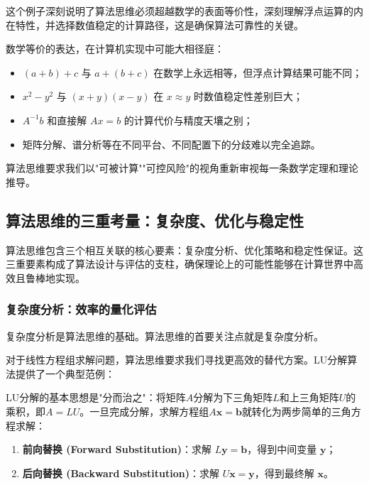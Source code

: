 这个例子深刻说明了算法思维必须超越数学的表面等价性，深刻理解浮点运算的内在特性，并选择数值稳定的计算路径，这是确保算法可靠性的关键。

\vspace{0.5em}
\begin{tcolorbox}[colback=red!5!white,colframe=red!75!black,title=警示：数学等价 ≠ 计算等价]
数学等价的表达，在计算机实现中可能大相径庭：
\begin{itemize}
\item $(a+b)+c$ 与 $a+(b+c)$ 在数学上永远相等，但浮点计算结果可能不同；
\item $x^2-y^2$ 与 $(x+y)(x-y)$ 在 $x\approx y$ 时数值稳定性差别巨大；
\item $A^{-1}b$ 和直接解 $Ax=b$ 的计算代价与精度天壤之别；
\item 矩阵分解、谱分析等在不同平台、不同配置下的分歧难以完全追踪。
\end{itemize}
算法思维要求我们以"可被计算""可控风险"的视角重新审视每一条数学定理和理论推导。
\end{tcolorbox}

\subsection{算法思维的三重考量：复杂度、优化与稳定性}
算法思维包含三个相互关联的核心要素：复杂度分析、优化策略和稳定性保证。这三重要素构成了算法设计与评估的支柱，确保理论上的可能性能够在计算世界中高效且鲁棒地实现。

\subsubsection{复杂度分析：效率的量化评估}

复杂度分析是算法思维的基础。算法思维的首要关注点就是复杂度分析。

对于线性方程组求解问题，算法思维要求我们寻找更高效的替代方案。LU分解算法提供了一个典型范例：

LU分解的基本思想是"分而治之"：将矩阵$A$分解为下三角矩阵$L$和上三角矩阵$U$的乘积，即$A = LU$。一旦完成分解，求解方程组$A\mathbf{x} = \mathbf{b}$就转化为两步简单的三角方程求解：
\begin{enumerate}
    \item \textbf{前向替换 (Forward Substitution)}：求解 $L\mathbf{y} = \mathbf{b}$，得到中间变量 $\mathbf{y}$；
    \item \textbf{后向替换 (Backward Substitution)}：求解 $U\mathbf{x} = \mathbf{y}$，得到最终解 $\mathbf{x}$。
\end{enumerate}


